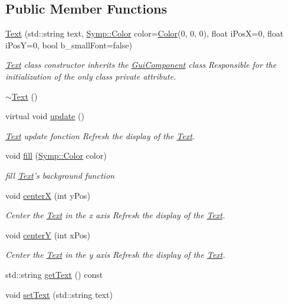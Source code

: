 \subsection*{Public Member Functions}
\begin{DoxyCompactItemize}
\item 
\hyperlink{class_symp_1_1_text_aa873244778f3aed01a7d7ecd9ce7006c}{Text} (std\-::string text, \hyperlink{struct_symp_1_1_color}{Symp\-::\-Color} color=\hyperlink{struct_symp_1_1_color}{Color}(0, 0, 0), float i\-Pos\-X=0, float i\-Pos\-Y=0, bool b\-\_\-small\-Font=false)
\begin{DoxyCompactList}\small\item\em \hyperlink{class_symp_1_1_text}{Text} class constructor inherits the \hyperlink{class_symp_1_1_gui_component}{Gui\-Component} class Responsible for the initialization of the only class private attribute. \end{DoxyCompactList}\item 
\hyperlink{class_symp_1_1_text_aa960cbce42553cab1c0e8118da966671}{$\sim$\-Text} ()
\item 
virtual void \hyperlink{class_symp_1_1_text_ab11eff488943981a0009549b77249a46}{update} ()
\begin{DoxyCompactList}\small\item\em \hyperlink{class_symp_1_1_text}{Text} update fonction Refresh the display of the \hyperlink{class_symp_1_1_text_aa873244778f3aed01a7d7ecd9ce7006c}{Text}. \end{DoxyCompactList}\item 
void \hyperlink{class_symp_1_1_text_a95198e44aa23b2948f844c1485b74f6f}{fill} (\hyperlink{struct_symp_1_1_color}{Symp\-::\-Color} color)
\begin{DoxyCompactList}\small\item\em fill \hyperlink{class_symp_1_1_text}{Text}'s background function \end{DoxyCompactList}\item 
void \hyperlink{class_symp_1_1_text_adcc35d491c41815f9cd1a5dd4d5b5a2c}{center\-X} (int y\-Pos)
\begin{DoxyCompactList}\small\item\em Center the \hyperlink{class_symp_1_1_text}{Text} in the x axis Refresh the display of the \hyperlink{class_symp_1_1_text_aa873244778f3aed01a7d7ecd9ce7006c}{Text}. \end{DoxyCompactList}\item 
void \hyperlink{class_symp_1_1_text_a0ab23dd09b189a4b61704a910273dcaa}{center\-Y} (int x\-Pos)
\begin{DoxyCompactList}\small\item\em Center the \hyperlink{class_symp_1_1_text}{Text} in the y axis Refresh the display of the \hyperlink{class_symp_1_1_text_aa873244778f3aed01a7d7ecd9ce7006c}{Text}. \end{DoxyCompactList}\item 
std\-::string \hyperlink{class_symp_1_1_text_a53b5852173ebf3093e857faddee74908}{get\-Text} () const 
\item 
void \hyperlink{class_symp_1_1_text_a9f3145a0f73eba8b65e4bfe8cb14d4c1}{set\-Text} (std\-::string text)
\end{DoxyCompactItemize}
